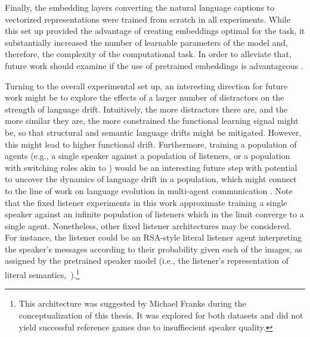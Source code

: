Finally, the embedding layers converting the natural language captions to vectorized representations were trained from scratch in all experiments. While this set up provided the advantage of creating embeddings optimal for the task, it substantially increased the number of learnable parameters of the model and, therefore, the complexity of the computational task. In order to alleviate that, future work should examine if the use of pretrained embeddings is advantageous \parencite[following, e.g.,][]{atliha2021pretrained}.

Turning to the overall experimental set up, an interesting direction for future work might be to explore the effects of a larger number of distractors on the strength of language drift. Intuitively, the more distractors there are, and the more similar they are, the more constrained the functional learning signal might be, so that structural and semantic language drifts might be mitigated. However, this might lead to higher functional drift. Furthermore, training a population of agents (e.g., a single speaker against a population of listeners, or a population with switching roles akin to \cite{bouchacourt2019miss}) would be an interesting future step with potential to uncover the dynamics of language drift in a population, which might connect to the line of work on language evolution in multi-agent communication \parencite[e.g.,][]{graesser2019emergent, chaabouni2019anti, kirby2014iterated}. Note that the fixed listener experiments in this work approximate training a single speaker against an infinite population of listeners which in the limit converge to a single agent. Nonetheless, other fixed listener architectures may be considered. For instance, the listener could be an RSA-style literal listener agent interpreting the speaker's messages according to their probability given each of the images, as assigned by the pretrained speaker model (i.e., the listener's representation of literal semantics,~\cite[cf.][]{frank2016rational}).\footnote{This architecture was suggested by Michael Franke during the conceptualization of this thesis. It was explored for both datasets and did not yield successful reference games due to insuffiecient speaker quality.} 

